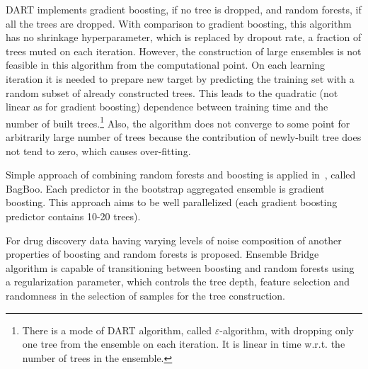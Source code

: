 DART implements gradient boosting, if no tree is dropped, and random forests, if all the trees are dropped.
With comparison to gradient boosting, this algorithm has no shrinkage hyperparameter, which is replaced by dropout rate, a fraction of trees muted on each iteration.
However, the construction of large ensembles is not feasible in this algorithm from the computational point.
On each learning iteration it is needed to prepare new target by predicting the training set with a random subset of already constructed trees.
This leads to the quadratic (not linear as for gradient boosting) dependence between training time and the number of built trees.\footnote{
There is a mode of DART algorithm, called $\varepsilon$-algorithm, with dropping only one tree from the ensemble on each iteration.
It is linear in time w.r.t. the number of trees in the ensemble.}
Also, the algorithm does not converge to some point for arbitrarily large number of trees because the contribution of newly-built tree does not tend to zero, which causes over-fitting.

Simple approach of combining random forests and boosting is applied in~\cite{key-bagboo}, called BagBoo. Each predictor in the bootstrap aggregated ensemble is gradient boosting. This approach aims to be well parallelized (each gradient boosting predictor contains 10-20 trees).

For drug discovery data having varying levels of noise composition of another properties of boosting and random forests is proposed. Ensemble Bridge~\cite{key-bridge} algorithm is capable of transitioning between boosting and random forests using a regularization parameter, which controls the tree depth, feature selection and randomness in the selection of samples for the tree construction. 

